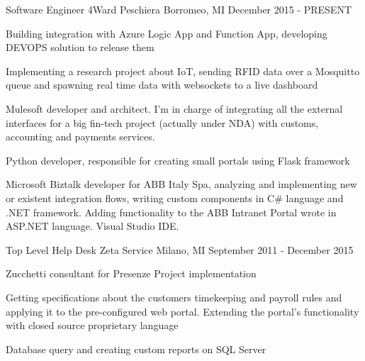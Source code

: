 
\begin{cventries}
  \cventry
    {Software Engineer} %
    {4Ward} %
    {Peschiera Borromeo, MI} %
    {December 2015 - PRESENT} %
    {
      \begin{cvitems} %
        \item {Building integration with Azure Logic App and Function App, developing DEVOPS solution to release them}
        \item {Implementing a research project about IoT, sending RFID data over a Mosquitto queue and spawning real time data with websockets to a live dashboard}
        \item {Mulesoft developer and architect. I’m in charge of integrating all the external interfaces for a big fin-tech project (actually under NDA) with customs, accounting and payments services.}
        \item {Python developer, responsible for creating small portals using Flask framework}
        \item {Microsoft Biztalk developer for ABB Italy Spa, analyzing and implementing new or existent integration flows, writing custom components in C\# language and .NET framework. Adding functionality to the ABB Intranet Portal wrote in ASP.NET language. Visual Studio IDE.
}
      \end{cvitems}
    }

  \cventry
    {Top Level Help Desk} %
    {Zeta Service} %
    {Milano, MI} %
    {September 2011 - December 2015} %
    {
      \begin{cvitems} %
        \item {Zucchetti consultant for Presenze Project implementation}
        \item {Getting specifications about the customers timekeeping and payroll rules and applying it to the pre-configured web portal. Extending the portal’s functionality with closed source proprietary language}
        \item {Database query and creating custom reports on SQL Server}
      \end{cvitems}
    }
    
\end{cventries}
